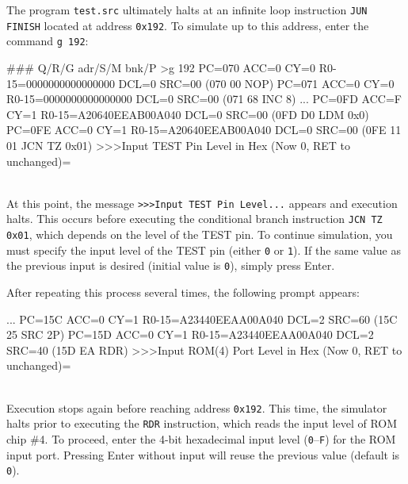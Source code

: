 The program \texttt{test.src} ultimately halts at an infinite loop instruction \texttt{JUN FINISH} located at address \texttt{0x192}.  
To simulate up to this address, enter the command \texttt{g 192}:\\

\begin{scriptsize}
\begin{boxedverbatim}
### Q/R/G adr/S/M bnk/P >g 192
  PC=070 ACC=0 CY=0 R0-15=0000000000000000 DCL=0 SRC=00  (070 00       NOP)
  PC=071 ACC=0 CY=0 R0-15=0000000000000000 DCL=0 SRC=00  (071 68       INC 8)
...
  PC=0FD ACC=F CY=1 R0-15=A20640EEAB00A040 DCL=0 SRC=00  (0FD D0       LDM 0x0)
  PC=0FE ACC=0 CY=1 R0-15=A20640EEAB00A040 DCL=0 SRC=00  (0FE 11 01    JCN TZ 0x01)
>>>Input TEST Pin Level in Hex (Now 0, RET to unchanged)=
\end{boxedverbatim}
\end{scriptsize}
\\

At this point, the message \texttt{>>>Input TEST Pin Level...} appears and execution halts.  
This occurs before executing the conditional branch instruction \texttt{JCN TZ 0x01}, which depends on the level of the TEST pin.  
To continue simulation, you must specify the input level of the TEST pin (either \texttt{0} or \texttt{1}).  
If the same value as the previous input is desired (initial value is \texttt{0}), simply press Enter.

After repeating this process several times, the following prompt appears:\\

\begin{scriptsize}
\begin{boxedverbatim}
...
  PC=15C ACC=0 CY=1 R0-15=A23440EEAA00A040 DCL=2 SRC=60  (15C 25       SRC 2P)
  PC=15D ACC=0 CY=1 R0-15=A23440EEAA00A040 DCL=2 SRC=40  (15D EA       RDR)
>>>Input ROM(4) Port Level in Hex (Now 0, RET to unchanged)=
\end{boxedverbatim}
\end{scriptsize}
\\

Execution stops again before reaching address \texttt{0x192}.  
This time, the simulator halts prior to executing the \texttt{RDR} instruction, which reads the input level of ROM chip \#4.  
To proceed, enter the 4-bit hexadecimal input level (\texttt{0}–\texttt{F}) for the ROM input port.  
Pressing Enter without input will reuse the previous value (default is \texttt{0}).

